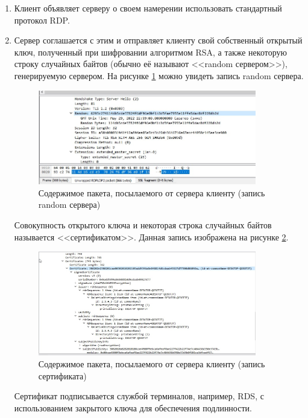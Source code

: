 \documentclass[bachelor, och, coursework]{SCWorks}
\begin{document}
  \begin{enumerate}
    \item Клиент объявляет серверу о своем намерении использовать стандартный протокол RDP.
    \item Сервер соглашается с этим и отправляет клиенту свой собственный открытый ключ, полученный при шифровании алгоритмом RSA, а также некоторую строку
    случайных байтов (обычно её называют <<random сервером>>), генерируемую сервером. На рисунке \ref{rndserv} можно увидеть запись random сервера.

    \begin{figure}[H]
      \centering
      \includegraphics[width=0.9\textwidth]{photo/rndserv.png}
      \caption{Содержимое пакета, посылаемого от сервера клиенту (запись random сервера)}
      \label{rndserv}
    \end{figure}

    Совокупность открытого ключа и некоторая строка случайных байтов называется <<сертификатом>>. Данная запись изображена на рисунке \ref{cert}.
    
    \begin{figure}[H]
      \centering
      \includegraphics[width=0.9\textwidth]{photo/cert.png}
      \caption{Содержимое пакета, посылаемого от сервера клиенту (запись сертификата)}
      \label{cert}
    \end{figure}
    
    Сертификат подписывается службой терминалов, например, RDS, с использованием закрытого ключа для обеспечения подлинности.


\end{enumerate}
\end{document}
